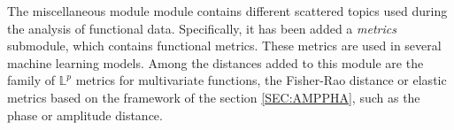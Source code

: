 

The miscellaneous module
module contains different scattered topics used during the analysis of
functional data. Specifically, it has been added a \textit{metrics} submodule, which
contains functional metrics.
These metrics are used in several machine learning models.
Among the distances added to this module are
the family of $\mathbb{L}^p$
metrics for multivariate functions, the Fisher-Rao distance or elastic metrics
based on the framework of the section \ref{SEC:AMPPHA}, such as the phase or
amplitude distance.
